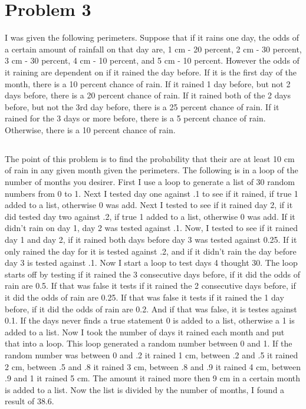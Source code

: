 \documentclass[twocolumn]{revtex4}
\begin{document}
\section{Problem 3}
I was given the following perimeters. Suppose that if it rains one day, the odds of a certain amount of rainfall on that day are, 1 cm - 20 percent, 2 cm - 30 percent, 3 cm - 30 percent, 4 cm - 10 percent, and  5 cm - 10 percent. However the odds of it raining are dependent on if it rained the day before. If it is the first day of the month, there is a 10 percent chance of rain. If it rained 1 day before, but not 2 days before, there is a 20 percent chance of rain.  If it rained both of the 2 days before, but not the 3rd day before, there is a 25 percent chance of rain.  If it rained for the 3 days or more before, there is a 5 percent chance of rain.  Otherwise, there is a 10 percent chance of rain.
\subsection{}
The point of this problem is to find the probability that their are at least 10 cm of rain in any given month given the perimeters. The following is in a loop of the number of months you desirer. First I use a loop to generate a list of 30 random numbers from 0 to 1. Next I tested day one against .1 to see if it rained, if true 1 added to a list, otherwise 0 was add. Next I tested to see if it rained day 2, if it did tested day two against .2,  if true 1 added to a list, otherwise 0 was add. If it didn't rain on day 1, day 2 was tested against .1. Now, I tested to see if it rained day 1 and day 2, if it rained both days before day 3 was tested against 0.25. If it only rained the day for it is tested against .2, and if it didn't rain the day before day 3 is tested against .1. Now I start a loop to test days 4 thought 30. The loop starts off by testing if it rained the 3 consecutive days before, if it did the odds of rain are 0.5. If that was false it tests if it rained the 2 consecutive days before, if it did the odds of rain are 0.25. If that was false it tests if it rained the 1 day before, if it did the odds of rain are 0.2. And if that was false, it is testes against 0.1. If the days never finds a true statement 0 is added to a list, otherwise a 1 is added to a list. Now I took the number of days it rained each month and put that into a loop. This loop generated a random number between 0 and 1. If the random number was between 0 and .2 it rained 1 cm, between .2 and .5 it rained 2 cm, between .5 and .8 it rained 3 cm, between .8 and .9 it rained 4 cm, between .9 and 1 it rained 5 cm. The amount it rained more then 9 cm in a certain month is added to a list. Now the list is divided by the number of months, I found a result of 38.6.
\end{document}
